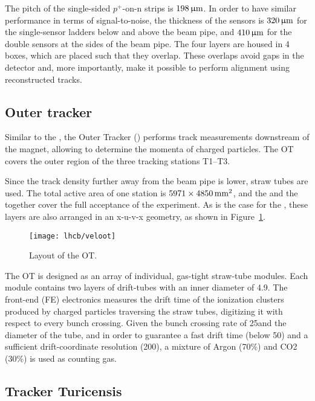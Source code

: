 The pitch of the single-sided $p^+$-on-n strips is $198{\,\upmu\rm m}$. In order to have
similar performance in terms of signal-to-noise, the thickness of the sensors
is $320{\,\upmu\rm m}$ for the single-sensor ladders below and above the beam pipe, and
$410{\,\upmu\rm m}$ for the double sensors at the sides of the beam pipe. The four
layers are housed in 4 boxes, which are placed such that they overlap. These
overlaps avoid gaps in the detector and, more importantly, make it possible to
perform alignment using reconstructed tracks.



\subsection{Outer tracker}

Similar to the \intr, the Outer Tracker (\ot) performs track measurements
downstream of the magnet, allowing to determine the momenta of charged
particles. The OT covers the outer region of the three tracking stations T1--T3.

Since the track density further away from the beam pipe is lower, straw tubes
are used. The total active area of one station is $5971\times4850\rm \,mm^2$, and
the \ot and the \intr together cover the full acceptance of the experiment. As is
the case for the \intr, these layers are also arranged in an x-u-v-x geometry, as
shown in Figure~\ref{fig:veloot}.

\begin{figure}[tb]
\begin{center}
\texttt{[image: lhcb/veloot]}
\end{center}
\caption{\small Layout of the OT.}
\label{fig:veloot}
\end{figure}

The OT is designed as an array of individual, gas-tight straw-tube modules.
Each module contains two layers of drift-tubes with an inner diameter of
4.9\mm. The front-end (FE) electronics measures the drift time of the
ionization clusters produced by charged particles traversing the straw tubes,
digitizing it with respect to every bunch crossing. Given the bunch crossing
rate of 25\ns and the diameter of the tube, and in order to guarantee a fast
drift time (below 50\ns) and a sufficient drift-coordinate resolution
(200\mum), a mixture of Argon (70\%) and CO2 (30\%) is used as counting gas.

\subsection{Tracker Turicensis}

